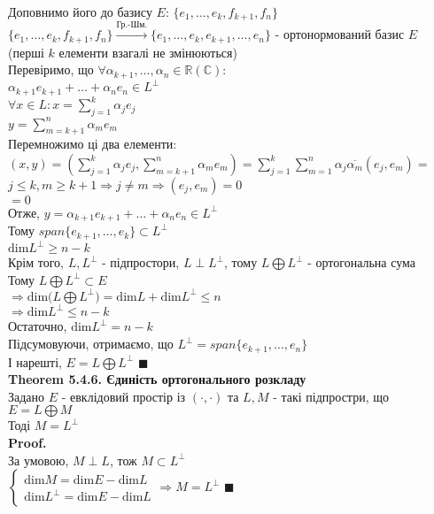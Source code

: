 \documentclass[a4paper, 14pt]{extarticle}
\def\huge{\displaystyle}
\def\th#1{\textbf{Theorem {#1}}}
\def\proof{\textbf{Proof.}\\}
\def\bigline{\vspace{5mm}\\}
\def\qed{$\blacksquare$}
\def\dim#1{\textrm{dim} {#1}}
\begin{document}
Доповнимо його до базису $E$: $\{e_1,\dots,e_k,f_{k+1},f_n\}$\\
$\{e_1,\dots,e_k,f_{k+1},f_n\} \overset{\textrm{Гр.-Шм.}}{\rightarrow} \{e_1,\dots,e_k, e_{k+1},\dots,e_n\}$ - ортонормований базис $E$\\
(перші $k$ елементи взагалі не змінюються)\\
Перевіримо, що $\forall \alpha_{k+1},\dots,\alpha_{n} \in \mathbb{R} (\mathbb{C}):$\\
$\alpha_{k+1}e_{k+1}+\dots+\alpha_n e_n \in L^{\perp}$\\
$\forall x \in L: x = \huge \sum_{j=1}^k \alpha_j e_j$\\
$y = \huge \sum_{m=k+1}^n \alpha_m e_{m}$\\
Перемножимо ці два елементи:\\
$(x,y) = \huge \left(\sum_{j=1}^k \alpha_j e_j, \sum_{m=k+1}^n \alpha_m e_m \right) = \sum_{j=1}^k \sum_{m=1}^n \alpha_j \overline{\alpha_m} (e_j,e_m) =$\\
$j \leq k, m \geq k+1 \Rightarrow j \neq m \Rightarrow (e_j,e_m) = 0$\\
$= 0$\\
Отже, $y = \alpha_{k+1}e_{k+1} + \dots + \alpha_n e_n \in L^{\perp}$\\
Тому $span\{e_{k+1},\dots,e_k\} \subset L^{\perp}$\\
$\dim L^{\perp} \geq n-k$\\
Крім того, $L,L^{\perp}$ - підпростори, $L \perp L^{\perp}$, тому $L \bigoplus L^{\perp}$ - ортогональна сума\\
Тому $L \bigoplus L^{\perp} \subset E$\\
$\Rightarrow \dim (L \bigoplus L^{\perp}) = \dim L + \dim L^{\perp} \leq n$\\
$\Rightarrow \dim L^{\perp} \leq n-k$\\
Остаточно, $\dim L^{\perp} = n-k$\\
Підсумовуючи, отримаємо, що $L^{\perp} = span\{e_{k+1},\dots, e_{n}\}$\\
І нарешті, $E = L \bigoplus L^{\perp}$ \qed
\bigline
\th{5.4.6. Єдиність ортогонального розкладу}\\
Задано $E$ - евклідовий простір із $(\cdot, \cdot)$ та $L,M$ - такі підпростри, що $E = L \bigoplus M$\\
Тоді $M = L^{\perp}$\\
\proof
За умовою, $M \perp L$, тож $M \subset L^{\perp}$\\
$\begin{cases}
\dim M = \dim E - \dim L \\
\dim L^{\perp} = \dim E - \dim L
\end{cases} \Rightarrow M = L^{\perp}$ \qed
\end{document}
